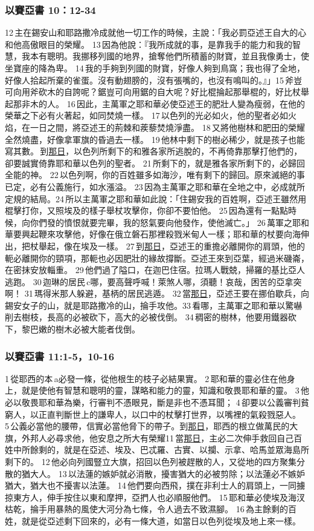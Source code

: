 \subsubsection{以賽亞書 10：12-34}
 12 主在錫安山和耶路撒冷成就他一切工作的時候，主說：「我必罰亞述王自大的心和他高傲眼目的榮耀。 13 因為他說：『我所成就的事，是靠我手的能力和我的智慧，我本有聰明。我挪移列國的地界，搶奪他們所積蓄的財寶，並且我像勇士，使坐寶座的降為卑。 14 我的手夠到列國的財寶，好像人夠到鳥窩；我也得了全地，好像人拾起所棄的雀蛋。沒有動翅膀的，沒有張嘴的，也沒有鳴叫的。』」15 斧豈可向用斧砍木的自誇呢？鋸豈可向用鋸的自大呢？好比棍掄起那舉棍的，好比杖舉起那非木的人。 16 因此，主萬軍之耶和華必使亞述王的肥壯人變為瘦弱，在他的榮華之下必有火著起，如同焚燒一樣。 17 以色列的光必如火，他的聖者必如火焰，在一日之間，將亞述王的荊棘和蒺藜焚燒淨盡。 18 又將他樹林和肥田的榮耀全然燒盡，好像拿軍旗的昏過去一樣。 19 他林中剩下的樹必稀少，就是孩子也能寫其數。 到\underline{那日}，以色列所剩下的和雅各家所逃脫的，不再倚靠那擊打他們的，卻要誠實倚靠耶和華以色列的聖者。 21 所剩下的，就是雅各家所剩下的，必歸回全能的神。 22 以色列啊，你的百姓雖多如海沙，唯有剩下的歸回。原來滅絕的事已定，必有公義施行，如水漲溢。 23 因為主萬軍之耶和華在全地之中，必成就所定規的結局。24 所以主萬軍之耶和華如此說：「住錫安我的百姓啊，亞述王雖然用棍擊打你，又照埃及的樣子舉杖攻擊你，你卻不要怕他。 25 因為還有一點點時候，向你們發的憤恨就要完畢，我的怒氣要向他發作，使他滅亡。」 26 萬軍之耶和華要興起鞭來攻擊他，好像在俄立磐石那裡殺戮米甸人一樣；耶和華的杖要向海伸出，把杖舉起，像在埃及一樣。 27 到\underline{那日}，亞述王的重擔必離開你的肩頭，他的軛必離開你的頸項，那軛也必因肥壯的緣故撐斷。亞述王來到亞葉，經過米磯崙，在密抹安放輜重。 29 他們過了隘口，在迦巴住宿。拉瑪人戰兢，掃羅的基比亞人逃跑。 30 迦琳的居民 c哪，要高聲呼喊！萊煞人哪，須聽！哀哉，困苦的亞拿突啊！ 31 瑪得米那人躲避，基柄的居民逃遁。 32 當\underline{那日}，亞述王要在挪伯歇兵，向錫安女子的山，就是耶路撒冷的山，掄手攻他。33 看哪，主萬軍之耶和華以驚嚇削去樹枝，長高的必被砍下，高大的必被伐倒。 34 稠密的樹林，他要用鐵器砍下，黎巴嫩的樹木必被大能者伐倒。

\subsubsection{以賽亞書 11:1-5，10-16}
1 從耶西的本 a必發一條，從他根生的枝子必結果實。 2 耶和華的靈必住在他身上，就是使他有智慧和聰明的靈，謀略和能力的靈，知識和敬畏耶和華的靈。 3 他必以敬畏耶和華為樂，行審判不憑眼見，斷是非也不憑耳聞； 4 卻要以公義審判貧窮人，以正直判斷世上的謙卑人，以口中的杖擊打世界，以嘴裡的氣殺戮惡人。 5 公義必當他的腰帶，信實必當他脅下的帶子。到\underline{那日}，耶西的根立做萬民的大旗，外邦人必尋求他，他安息之所大有榮耀11 當\underline{那日}，主必二次伸手救回自己百姓中所餘剩的，就是在亞述、埃及、巴忒羅、古實、以攔、示拿、哈馬並眾海島所剩下的。 12 他必向列國豎立大旗，招回以色列被趕散的人，又從地的四方聚集分散的猶大人。 13 以法蓮的嫉妒就必消散，擾害猶大的必被剪除；以法蓮必不嫉妒猶大，猶大也不擾害以法蓮。 14 他們要向西飛，撲在非利士人的肩頭上，一同擄掠東方人，伸手按住以東和摩押，亞捫人也必順服他們。 15 耶和華必使埃及海汊枯乾，掄手用暴熱的風使大河分為七條，令人過去不致濕腳。 16 為主餘剩的百姓，就是從亞述剩下回來的，必有一條大道，如當日以色列從埃及地上來一樣。

